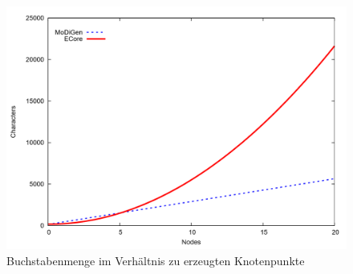 \begin{figure}[H]
\centering
\includegraphics[width=\linewidth]{Abschnitte/Abbildungen/Grafiken/Characters-and-Nodes}
\caption{Buchstabenmenge im Verhältnis zu erzeugten Knotenpunkte}
\end{figure}

